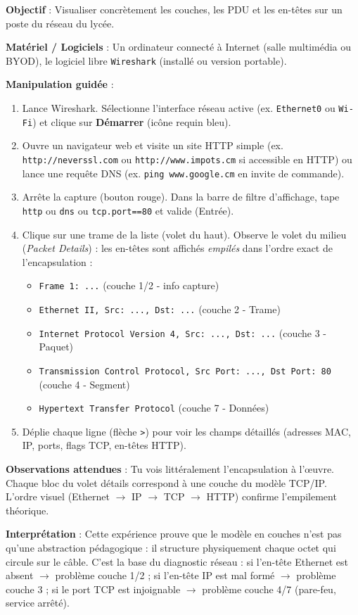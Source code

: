 \documentclass[11pt]{article}
\begin{document}
\begin{experience}
\textbf{Objectif} : Visualiser concrètement les couches, les PDU et les en-têtes sur un poste du réseau du lycée.

\textbf{Matériel / Logiciels} : Un ordinateur connecté à Internet (salle multimédia ou BYOD), le logiciel libre \texttt{Wireshark} (installé ou version portable).

\textbf{Manipulation guidée} :
\begin{enumerate}
\item Lance Wireshark. Sélectionne l'interface réseau active (ex. \texttt{Ethernet0} ou \texttt{Wi-Fi}) et clique sur \textbf{Démarrer} (icône requin bleu).
\item Ouvre un navigateur web et visite un site HTTP simple (ex. \texttt{http://neverssl.com} ou \texttt{http://www.impots.cm} si accessible en HTTP) ou lance une requête DNS (ex. \texttt{ping www.google.cm} en invite de commande).
\item Arrête la capture (bouton rouge). Dans la barre de filtre d'affichage, tape \texttt{http} ou \texttt{dns} ou \texttt{tcp.port==80} et valide (Entrée).
\item Clique sur une trame de la liste (volet du haut). Observe le volet du milieu (\emph{Packet Details}) : les en-têtes sont affichés \emph{empilés} dans l'ordre exact de l'encapsulation :
\begin{itemize}
\item \texttt{Frame 1: ...} (couche 1/2 - info capture)
\item \texttt{Ethernet II, Src: ..., Dst: ...} (couche 2 - Trame)
\item \texttt{Internet Protocol Version 4, Src: ..., Dst: ...} (couche 3 - Paquet)
\item \texttt{Transmission Control Protocol, Src Port: ..., Dst Port: 80} (couche 4 - Segment)
\item \texttt{Hypertext Transfer Protocol} (couche 7 - Données)
\end{itemize}
\item Déplie chaque ligne (flèche \texttt{>}) pour voir les champs détaillés (adresses MAC, IP, ports, flags TCP, en-têtes HTTP).
\end{enumerate}

\textbf{Observations attendues} : Tu vois littéralement l'encapsulation à l'œuvre. Chaque bloc du volet détails correspond à une couche du modèle TCP/IP. L'ordre visuel (Ethernet $\rightarrow$ IP $\rightarrow$ TCP $\rightarrow$ HTTP) confirme l'empilement théorique.

\textbf{Interprétation} : Cette expérience prouve que le modèle en couches n'est pas qu'une abstraction pédagogique : il structure physiquement chaque octet qui circule sur le câble. C'est la base du diagnostic réseau : si l'en-tête Ethernet est absent $\rightarrow$ problème couche 1/2 ; si l'en-tête IP est mal formé $\rightarrow$ problème couche 3 ; si le port TCP est injoignable $\rightarrow$ problème couche 4/7 (pare-feu, service arrêté).
\end{experience}
\end{document}
